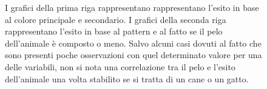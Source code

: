 \begin{figure}[!ht]
	\centering
	\quad
	
	\quad
	\caption{I grafici della prima riga rappresentano rappresentano l'esito in base al colore principale e secondario. I grafici della seconda riga rappresentano l'esito in base al pattern e al fatto se il pelo dell'animale è composto o meno. Salvo alcuni casi dovuti al fatto che sono presenti poche osservazioni con quel determinato valore per una delle variabili, non si nota una correlazione tra il pelo e l'esito dell'animale una volta stabilito se si tratta di un cane o un gatto.}
	\label{fig-colors}
\end{figure}

